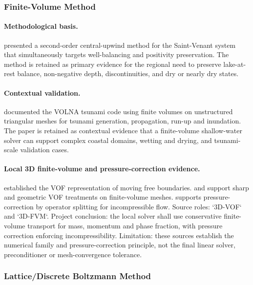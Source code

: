 \subsubsection{Finite-Volume Method}
\label{sec:res-num-frm-evidence-fvm}

\paragraph{Methodological basis.}
\textcite{kurganov2007wellbalanced} presented a second-order
central-upwind method for the Saint-Venant system that simultaneously
targets well-balancing and positivity preservation. The method is
retained as primary evidence for the regional need to preserve lake-at-
rest balance, non-negative depth, discontinuities, and dry or nearly dry
states.

\paragraph{Contextual validation.}
\textcite{dutykh2011volna} documented the VOLNA tsunami code using
finite volumes on unstructured triangular meshes for tsunami generation,
propagation, run-up and inundation. The paper is retained as contextual
evidence that a finite-volume shallow-water solver can support complex
coastal domains, wetting and drying, and tsunami-scale validation cases.

\paragraph{Local 3D finite-volume and pressure-correction evidence.}
\textcite{hirt1981vof} established the VOF representation of moving
free boundaries. \textcite{vukcevic2018sharp} and
\textcite{roenby2016computational} support sharp and geometric VOF
treatments on finite-volume meshes. \textcite{issa1986operator}
supports pressure-correction by operator splitting for incompressible
flow. Source roles: `3D-VOF` and `3D-FVM`. Project conclusion: the
local solver shall use conservative finite-volume transport for mass,
momentum and phase fraction, with pressure correction enforcing
incompressibility. Limitation: these sources establish the numerical
family and pressure-correction principle, not the final linear solver,
preconditioner or mesh-convergence tolerance.

\subsubsection{Lattice/Discrete Boltzmann Method}
\label{sec:res-num-frm-evidence-dbm}

